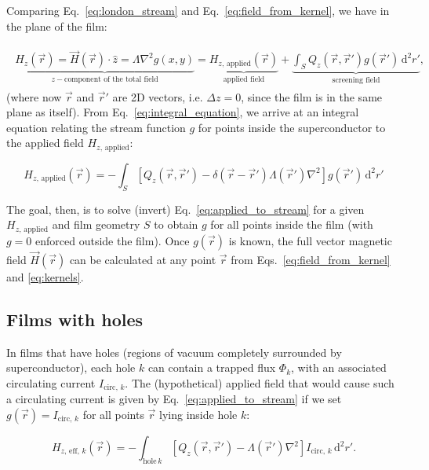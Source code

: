 \documentclass{article}
\begin{document}
Comparing Eq.~\ref{eq:london_stream} and Eq.~\ref{eq:field_from_kernel}, we have in the plane of the film:

\begin{align}
    \label{eq:integral_equation}
    \begin{split}
        \underbrace{H_z(\vec{r}) = \vec{H}(\vec{r})\cdot\hat{z}
        = \Lambda\nabla^2g(x, y)}_{z-\text{component of the total field}}
        = \underbrace{H_{z,\,\mathrm{applied}}(\vec{r})}_{\text{applied field}}
        + \underbrace{\int_S Q_z(\vec{r},\vec{r}')g(\vec{r}')\,\mathrm{d}^2r'}_{\text{screening field}},
    \end{split}
\end{align}
(where now $\vec{r}$ and $\vec{r}'$ are 2D vectors, i.e. $\Delta z=0$, since the film is in the same plane as itself). From Eq.~\ref{eq:integral_equation}, we arrive at an integral equation relating the stream function $g$ for points inside the superconductor to the applied field $H_{z,\,\mathrm{applied}}$:

\begin{equation}
    \label{eq:applied_to_stream}
    H_{z,\,\mathrm{applied}}(\vec{r})
    = -\int_S\left[
        Q_z(\vec{r},\vec{r}')-\delta(\vec{r}-\vec{r}')\Lambda(\vec{r}')\nabla^2\right
    ]g(\vec{r}')\,\mathrm{d}^2r'
\end{equation}

The goal, then, is to solve (invert) Eq.~\ref{eq:applied_to_stream} for a given $H_{z,\,\mathrm{applied}}$ and film geometry $S$ to obtain $g$ for all points inside the film (with $g=0$ enforced outside the film). Once $g(\vec{r})$ is known, the full vector magnetic field $\vec{H}(\vec{r})$ can be calculated at any point $\vec{r}$
from Eqs.~\ref{eq:field_from_kernel} and \ref{eq:kernels}.

\subsection{Films with holes}
\label{section:model:holes}

In films that have holes (regions of vacuum completely surrounded by superconductor), each hole $k$ can contain a trapped flux $\Phi_k$, with an associated circulating current $I_{\mathrm{circ},\,k}$. The (hypothetical) applied field that would cause such a circulating current is given by Eq.~\ref{eq:applied_to_stream} if we set $g(\vec{r})=I_{\mathrm{circ},\,k}$ for all points $\vec{r}$ lying inside hole $k$:

\begin{equation}
    \label{eq:Heff}
    H_{z,\,\mathrm{eff},\,k}(\vec{r}) = -\int_{\mathrm{hole}\,k}[
        Q_z(\vec{r},\vec{r}')-\Lambda(\vec{r}')\nabla^2
    ] I_{\mathrm{circ},\,k} \,\mathrm{d}^2r'.   
\end{equation}
\end{document}
